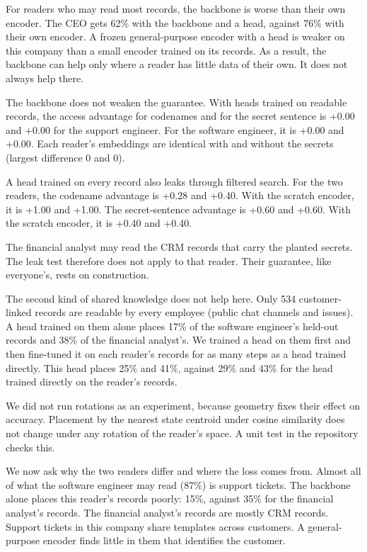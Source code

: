 \documentclass[11pt]{article}
\begin{document}
For readers who may read most records, the backbone is worse than their own encoder. The CEO gets 62\% with the backbone and a head, against 76\% with their own encoder. A frozen general-purpose encoder with a head is weaker on this company than a small encoder trained on its records. As a result, the backbone can help only where a reader has little data of their own. It does not always help there.

The backbone does not weaken the guarantee. With heads trained on readable records, the access advantage for codenames and for the secret sentence is +0.00 and +0.00 for the support engineer. For the software engineer, it is +0.00 and +0.00. Each reader's embeddings are identical with and without the secrets (largest difference 0 and 0).

A head trained on every record also leaks through filtered search. For the two readers, the codename advantage is +0.28 and +0.40. With the scratch encoder, it is +1.00 and +1.00. The secret-sentence advantage is +0.60 and +0.60. With the scratch encoder, it is +0.40 and +0.40.

The financial analyst may read the CRM records that carry the planted secrets. The leak test therefore does not apply to that reader. Their guarantee, like everyone's, rests on construction.

The second kind of shared knowledge does not help here. Only 534 customer-linked records are readable by every employee (public chat channels and issues). A head trained on them alone places 17\% of the software engineer's held-out records and 38\% of the financial analyst's. We trained a head on them first and then fine-tuned it on each reader's records for as many steps as a head trained directly. This head places 25\% and 41\%, against 29\% and 43\% for the head trained directly on the reader's records.

We did not run rotations as an experiment, because geometry fixes their effect on accuracy. Placement by the nearest state centroid under cosine similarity does not change under any rotation of the reader's space. A unit test in the repository checks this.

We now ask why the two readers differ and where the loss comes from. Almost all of what the software engineer may read (87\%) is support tickets. The backbone alone places this reader's records poorly: 15\%, against 35\% for the financial analyst's records. The financial analyst's records are mostly CRM records. Support tickets in this company share templates across customers. A general-purpose encoder finds little in them that identifies the customer.
\end{document}
